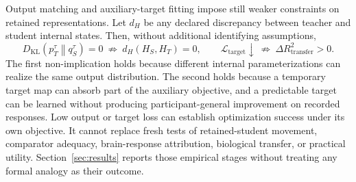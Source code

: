Output matching and auxiliary-target fitting impose still weaker constraints on retained representations.
Let \(d_H\) be any declared discrepancy between teacher and student internal states.
Then, without additional identifying assumptions,
\[
  D_{\mathrm{KL}}\!\left(p_T^\tau\middle\|q_S^\tau\right)=0
  \ \not\Rightarrow\
  d_H(H_S,H_T)=0,
  \qquad
  \mathcal L_{\mathrm{target}}\downarrow
  \ \not\Rightarrow\
  \Delta R_{\mathrm{transfer}}^2>0.
\]
The first non-implication holds because different internal parameterizations can realize the same output distribution.
The second holds because a temporary target map can absorb part of the auxiliary objective, and a predictable target can be learned without producing participant-general improvement on recorded responses.
Low output or target loss can establish optimization success under its own objective.
It cannot replace fresh tests of retained-student movement, comparator adequacy, brain-response attribution, biological transfer, or practical utility.
Section~\ref{sec:results} reports those empirical stages without treating any formal analogy as their outcome. 
